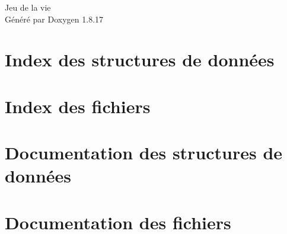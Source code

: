 \let\mypdfximage\pdfximage\def\pdfximage{\immediate\mypdfximage}\documentclass[twoside]{book}
\newcommand{\+}{\discretionary{\mbox{\scriptsize$\hookleftarrow$}}{}{}}
\newcommand{\clearemptydoublepage}{%
  \newpage{\pagestyle{empty}\cleardoublepage}%
}
\begin{document}
\hypersetup{pageanchor=false,
             bookmarksnumbered=true,
             pdfencoding=unicode
            }
\begin{titlepage}
\vspace*{7cm}
\begin{center}%
{\Large Jeu de la vie }\\
\vspace*{1cm}
{\large Généré par Doxygen 1.8.17}\\
\end{center}
\end{titlepage}
\clearemptydoublepage
{}
\tableofcontents
\clearemptydoublepage
{}
\hypersetup{pageanchor=true}

\chapter{Index des structures de données}

\chapter{Index des fichiers}

\chapter{Documentation des structures de données}

\chapter{Documentation des fichiers}


\backmatter
\newpage
{}
\clearemptydoublepage
{}
\printindex
\end{document}
